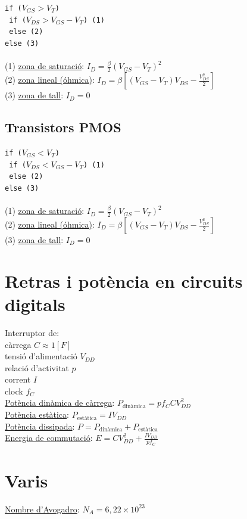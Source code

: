 \documentclass[12pt]{article}
\begin{document}
\begin{multicols}{4}
\texttt{if ($V_{GS} > V_T$) }\\
\texttt{ if ($V_{DS} > V_{GS} - V_T$) (1)} \\
\texttt{ else (2)} \\
\texttt{else (3)} \\
\texttt{ } \\
(1) \underline{zona de saturació}: $I_D = \frac{\beta}{2} (V_{GS}-V_T)^2$ \\
(2) \underline{zona lineal (óhmica)}: $I_D = \beta \left[ \left( V_{GS} - V_T \right) V_{DS} - \frac{V_{DS}^2}{2} \right]$ \\
(3) \underline{zona de tall}: $I_D = 0$

\subsection{Transistors PMOS}

\texttt{if ($V_{GS} < V_T$) }\\
\texttt{ if ($V_{DS} < V_{GS} - V_T$) (1)} \\
\texttt{ else (2)} \\
\texttt{else (3)} \\
\texttt{ } \\
(1) \underline{zona de saturació}: $I_D = \frac{\beta}{2} (V_{GS}-V_T)^2$ \\
(2) \underline{zona lineal (óhmica)}: $I_D = \beta \left[ \left( V_{GS} - V_T \right) V_{DS} - \frac{V_{DS}^2}{2} \right]$ \\
(3) \underline{zona de tall}: $I_D = 0$

\section{Retras i potència en circuits digitals}

Interruptor de: \\
\qquad càrrega $C \approx 1 [F]$ \\
\qquad tensió d'alimentació $V_{DD}$ \\
\qquad relació d'activitat $p$ \\
\qquad corrent $I$ \\
\qquad clock $f_C$ \\
\underline{Potència dinàmica de càrrega}: $P_{\text{dinàmica}} = p f_C C V_{DD}^2$ \\
\underline{Potència estàtica}: $P_{\text{estàtica}} = I V_{DD}$ \\
\underline{Potència dissipada}: $P = P_{\text{dinàmica}} + P_{\text{estàtica}}$ \\
\underline{Energia de commutació}: $E = C V_{DD}^2 + \frac{I V_{DD}}{p f_C}$

\section{Varis}

\underline{Nombre d'Avogadro}: $N_A = 6,22 \times 10^{23}$ \\

\end{multicols}
\end{document}
